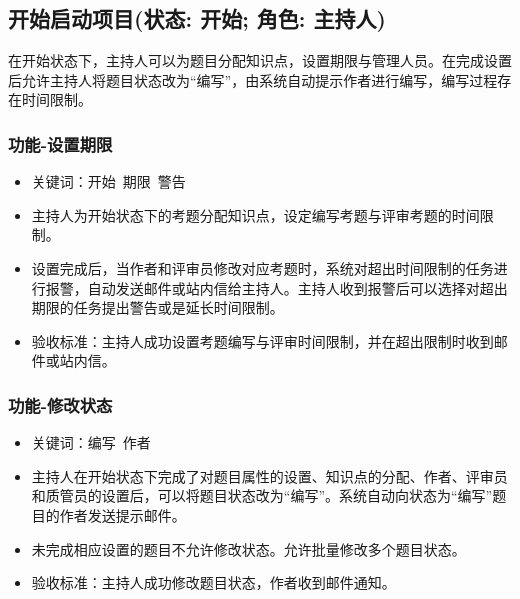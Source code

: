 \documentclass[hyperref, a4paper]{ctexart}
\providecommand{\tightlist}{%
  \setlength{\itemsep}{0pt}\setlength{\parskip}{0pt}}
\begin{document}
\hypertarget{ux5f00ux59cbux542fux52a8ux9879ux76eeux72b6ux6001-ux5f00ux59cb-ux89d2ux8272-ux4e3bux6301ux4eba}{%
\subsection{开始启动项目(状态: 开始; 角色:
主持人)}\label{ux5f00ux59cbux542fux52a8ux9879ux76eeux72b6ux6001-ux5f00ux59cb-ux89d2ux8272-ux4e3bux6301ux4eba}}

在开始状态下，主持人可以为题目分配知识点，设置期限与管理人员。在完成设置后允许主持人将题目状态改为``编写''，由系统自动提示作者进行编写，编写过程存在时间限制。

\hypertarget{ux529fux80fd-ux8bbeux7f6eux671fux9650}{%
\subsubsection{功能-设置期限}\label{ux529fux80fd-ux8bbeux7f6eux671fux9650}}

\begin{itemize}
\tightlist
\item
  关键词：开始~期限~警告
\item
  主持人为开始状态下的考题分配知识点，设定编写考题与评审考题的时间限制。
\item
  设置完成后，当作者和评审员修改对应考题时，系统对超出时间限制的任务进行报警，自动发送邮件或站内信给主持人。主持人收到报警后可以选择对超出期限的任务提出警告或是延长时间限制。
\item
  验收标准：主持人成功设置考题编写与评审时间限制，并在超出限制时收到邮件或站内信。
\end{itemize}

\hypertarget{ux529fux80fd-ux4feeux6539ux72b6ux6001}{%
\subsubsection{功能-修改状态}\label{ux529fux80fd-ux4feeux6539ux72b6ux6001}}

\begin{itemize}
\tightlist
\item
  关键词：编写~作者
\item
  主持人在开始状态下完成了对题目属性的设置、知识点的分配、作者、评审员和质管员的设置后，可以将题目状态改为``编写''。系统自动向状态为``编写''题目的作者发送提示邮件。
\item
  未完成相应设置的题目不允许修改状态。允许批量修改多个题目状态。
\item
  验收标准：主持人成功修改题目状态，作者收到邮件通知。
\end{itemize}
\end{document}
